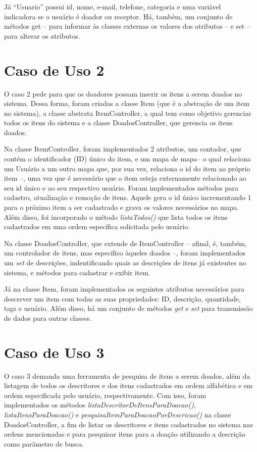\documentclass[journal,12pt,onecolumn,draftclsnofoot,]{article}
\begin{document}
	Já “Usuario” possui id, nome, e-mail, telefone, categoria e uma variável indicadora se o usuário é doador ou receptor. Há, também, um conjunto de métodos get -- para informar às classes externas os valores dos atributos -- e set -- para alterar os atributos.
			
	\section{Caso de Uso 2}
	O caso 2 pede para que os doadores possam inserir os itens a serem doados no sistema. Dessa forma, foram criadas a classe Item (que é a abstração de um item no sistema), a classe abstrata ItemController, a qual tem como objetivo gerenciar todos os itens do sistema e a classe DoadosController, que gerencia os itens doados.
	
	Na classe ItemController, foram implementados 2 atributos, um contador, que contém o identificador (ID) único do item, e um mapa de mapa-- o qual relaciona um Usuário a um outro mapa que, por sua vez, relaciona o id do item ao próprio item --, uma vez que é necessário que o item esteja externamente relacionado ao seu id único e ao seu respectivo usuário. Foram implementados métodos para cadastro, atualização e remoção de itens. Aquele gera o id único incrementando 1 para o próximo item a ser cadastrado e grava os valores necessários no mapa. Além disso, foi incorporado o método \textit{listaTodos()} que lista todos os itens cadastrados em uma ordem específica solicitada pelo usuário. 

	Na classe DoadosController, que extende de ItemController -- afinal, é, também, um controlador de itens, mas específico àqueles doados --, foram implementados um \textit{set} de descrições, indentificando quais as descrições de itens já existentes no sistema, e métodos para cadastrar e exibir item.

	Já na classe Item, foram implementados os seguintes atributos necessários para descrever um item com todas as suas propriedades: ID, descrição, quantidade, tags e usuário. Além disso, há um conjunto de métodos \textit{get} e \textit{set} para transmissão de dados para outras classes.
	
	
	\section{Caso de Uso 3}
	O caso 3 demanda uma ferramenta de pesquisa de itens a serem doados, além da listagem de todos os descritores e dos itens cadastrados em ordem alfabética e em ordem especificada pelo usuário, respectivamente. Com isso, foram implementados os métodos \textit{listaDescritorDeItensParaDoacao()}, \textit{listaItensParaDoacao()} e \textit{pesquisaItemParaDoacaoPorDescricao()} na classe DoadosController, a fim de listar os descritores e itens cadastrados no sistema nas ordens mencionadas e para pesquisar itens para a doação utilizando a descrição como parâmetro de busca.
	
\end{document}
